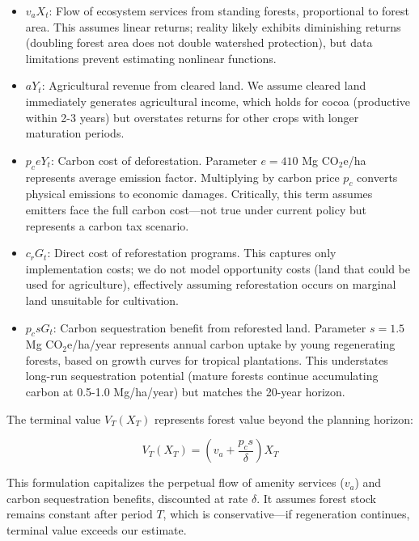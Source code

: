 \begin{itemize}
    \item $v_a X_t$: Flow of ecosystem services from standing forests, proportional to forest area. This assumes linear returns; reality likely exhibits diminishing returns (doubling forest area does not double watershed protection), but data limitations prevent estimating nonlinear functions.

    \item $aY_t$: Agricultural revenue from cleared land. We assume cleared land immediately generates agricultural income, which holds for cocoa (productive within 2-3 years) but overstates returns for other crops with longer maturation periods.

    \item $p_c eY_t$: Carbon cost of deforestation. Parameter $e = 410$ Mg CO$_2$e/ha represents average emission factor. Multiplying by carbon price $p_c$ converts physical emissions to economic damages. Critically, this term assumes emitters face the full carbon cost—not true under current policy but represents a carbon tax scenario.

    \item $c_r G_t$: Direct cost of reforestation programs. This captures only implementation costs; we do not model opportunity costs (land that could be used for agriculture), effectively assuming reforestation occurs on marginal land unsuitable for cultivation.

    \item $p_c sG_t$: Carbon sequestration benefit from reforested land. Parameter $s = 1.5$ Mg CO$_2$e/ha/year represents annual carbon uptake by young regenerating forests, based on \citet{poorter2016biomass} growth curves for tropical plantations. This understates long-run sequestration potential (mature forests continue accumulating carbon at 0.5-1.0 Mg/ha/year) but matches the 20-year horizon.
\end{itemize}

The terminal value $V_T(X_T)$ represents forest value beyond the planning horizon:

\begin{equation}
V_T(X_T) = \left( v_a + \frac{p_c s}{\delta} \right) X_T
\end{equation}

This formulation capitalizes the perpetual flow of amenity services ($v_a$) and carbon sequestration benefits, discounted at rate $\delta$. It assumes forest stock remains constant after period $T$, which is conservative—if regeneration continues, terminal value exceeds our estimate.

